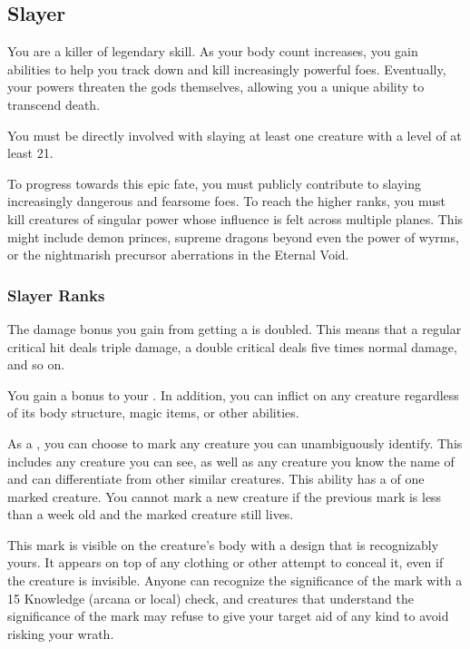   \subsection{Slayer}
    You are a killer of legendary skill.
    As your body count increases, you gain abilities to help you track down and kill increasingly powerful foes.
    Eventually, your powers threaten the gods themselves, allowing you a unique ability to transcend death.

     You must be directly involved with slaying at least one  creature with a level of at least 21.

     To progress towards this epic fate, you must publicly contribute to slaying increasingly dangerous and fearsome foes.
    To reach the higher ranks, you must kill creatures of singular power whose influence is felt across multiple planes.
    This might include demon princes, supreme dragons beyond even the power of wyrms, or the nightmarish precursor aberrations in the Eternal Void.

    \subsubsection{Slayer Ranks}
       The damage bonus you gain from getting a  is doubled.
      This means that a regular critical hit deals triple damage, a double critical deals five times normal damage, and so on.

       You gain a  bonus to your .
      In addition, you can inflict  on any creature regardless of its body structure, magic items, or other abilities.

       As a , you can choose to mark any creature you can unambiguously identify.
      This includes any creature you can see, as well as any creature you know the name of and can differentiate from other similar creatures.
      This ability has a  of one marked creature.
      You cannot mark a new creature if the previous mark is less than a week old and the marked creature still lives.

      This mark is visible on the creature's body with a design that is recognizably yours.
      It appears on top of any clothing or other attempt to conceal it, even if the creature is invisible.
      Anyone can recognize the significance of the mark with a  15 Knowledge (arcana or local) check, and creatures that understand the significance of the mark may refuse to give your target aid of any kind to avoid risking your wrath.

